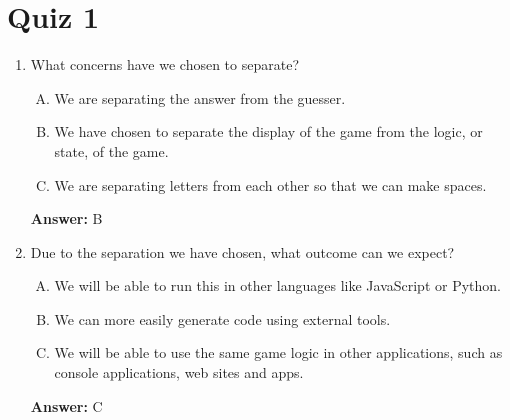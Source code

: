 \documentclass[12pt]{article}
\begin{document}
\section{Quiz 1}

\bigskip

\begin{enumerate}[1.]
    \item

    What concerns have we chosen to separate?

    \bigskip

    \begin{enumerate}[A.]
        \item We are separating the answer from the guesser.
        \item We have chosen to separate the display of the game from the logic, or state, of the game.
        \item We are separating letters from each other so that we can make spaces.
    \end{enumerate}

    \bigskip

    \textbf{Answer:} B

    \item

    Due to the separation we have chosen, what outcome can we expect?

    \bigskip

    \begin{enumerate}[A.]
        \item We will be able to run this in other languages like JavaScript or Python.
        \item We can more easily generate code using external tools.
        \item We will be able to use the same game logic in other applications, such as console applications, web sites and apps.
    \end{enumerate}

    \bigskip

    \textbf{Answer:} C

\end{enumerate}
\end{document}
